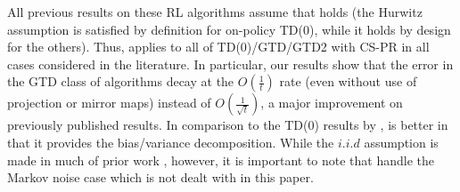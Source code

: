 All previous results on these RL algorithms assume that  holds (the Hurwitz assumption is satisfied by definition for on-policy TD(0), while it holds by design for the others). 
Thus,  applies to all of TD(0)/GTD/GTD2 with CS-PR in all cases considered in the literature.
In particular, our results show that the error in the GTD class of algorithms decay at the $O(\frac{1}{t})$ rate (even without use of projection or mirror maps) instead of $O(\frac{1}{\sqrt{t}})$, a major improvement on previously published results. In comparison to the TD(0) results by \citet{korda-prashanth},  is better in that it provides the bias/variance decomposition. %
While the $i.i.d$ assumption is made in much of prior work \cite{gtd2,gtdmp}, however, it is important to note that \citet{korda-prashanth} handle the Markov noise case which is not dealt with in this paper. 
